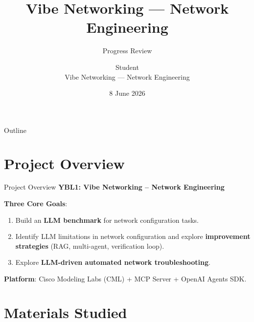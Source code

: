 \documentclass[11pt,aspectratio=169]{beamer}
\title[Progress Review]{Vibe Networking --- Network Engineering}
\subtitle{Progress Review}
\author[Student]
       {Student\\[4pt]
        \small Vibe Networking --- Network Engineering}
\date{8 June 2026}
\institute{Information Engineering Final Year Project}
\begin{document}
\begin{frame}
  \titlepage
\end{frame}

\begin{frame}{Outline}
  \tableofcontents
\end{frame}

\section{Project Overview}

\begin{frame}{Project Overview}
  \textbf{YBL1: Vibe Networking -- Network Engineering}

  \vspace{8pt}
  \textbf{Three Core Goals}:
  \begin{enumerate}
    \item Build an \textbf{LLM benchmark} for network configuration tasks.
    \item Identify LLM limitations in network configuration and explore
          \textbf{improvement strategies} (RAG, multi-agent, verification loop).
    \item Explore \textbf{LLM-driven automated network troubleshooting}.
  \end{enumerate}

  \vspace{8pt}
  \textbf{Platform}: Cisco Modeling Labs (CML) + MCP Server + OpenAI Agents SDK.
\end{frame}

\section{Materials Studied}
\end{document}

